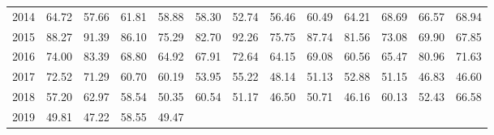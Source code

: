 \begin{longtable}{rrrrrrrrrrrrr}
  2014 & 64.72 & 57.66 & 61.81 & 58.88 & 58.30 & 52.74 & 56.46 & 60.49 & 64.21 & 68.69 & 66.57 & 68.94 \\ 
  2015 & 88.27 & 91.39 & 86.10 & 75.29 & 82.70 & 92.26 & 75.75 & 87.74 & 81.56 & 73.08 & 69.90 & 67.85 \\ 
  2016 & 74.00 & 83.39 & 68.80 & 64.92 & 67.91 & 72.64 & 64.15 & 69.08 & 60.56 & 65.47 & 80.96 & 71.63 \\ 
  2017 & 72.52 & 71.29 & 60.70 & 60.19 & 53.95 & 55.22 & 48.14 & 51.13 & 52.88 & 51.15 & 46.83 & 46.60 \\ 
  2018 & 57.20 & 62.97 & 58.54 & 50.35 & 60.54 & 51.17 & 46.50 & 50.71 & 46.16 & 60.13 & 52.43 & 66.58 \\ 
  2019 & 49.81 & 47.22 & 58.55 & 49.47 &  &  &  &  &  &  &  &  \\ 
   \hline
\hline
\end{longtable}
